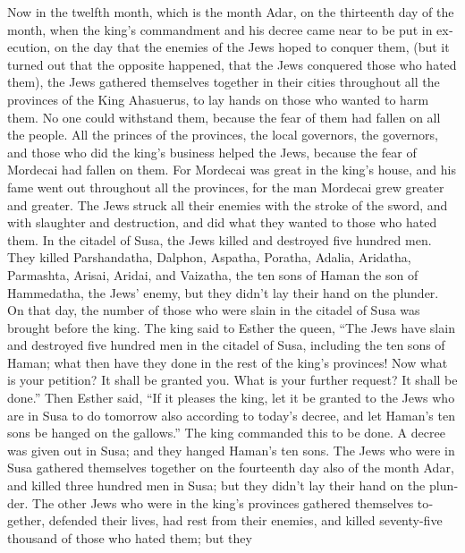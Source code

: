 \begin{paracol}{2}
\begin{otherlanguage}{english}
 Now in the twelfth month, which is the month Adar, on the
thirteenth day of the month, when the king's commandment and his decree
came near to be put in execution, on the day that the enemies of the
Jews hoped to conquer them, (but it turned out that the opposite
happened, that the Jews conquered those who hated them), 
the Jews gathered themselves together in their cities throughout all the
provinces of the King Ahasuerus, to lay hands on those who wanted to
harm them. No one could withstand them, because the fear of them had
fallen on all the people.  All the princes of the
provinces, the local governors, the governors, and those who did the
king's business helped the Jews, because the fear of Mordecai had fallen
on them.  For Mordecai was great in the king's house, and
his fame went out throughout all the provinces, for the man Mordecai
grew greater and greater.  The Jews struck all their
enemies with the stroke of the sword, and with slaughter and
destruction, and did what they wanted to those who hated them.
 In the citadel of Susa, the Jews killed and destroyed
five hundred men.  They killed Parshandatha, Dalphon,
Aspatha,  Poratha, Adalia, Aridatha, 
Parmashta, Arisai, Aridai, and Vaizatha,  the ten sons of
Haman the son of Hammedatha, the Jews' enemy, but they didn't lay their
hand on the plunder.  On that day, the number of those
who were slain in the citadel of Susa was brought before the king.
 The king said to Esther the queen, ``The Jews have slain
and destroyed five hundred men in the citadel of Susa, including the ten
sons of Haman; what then have they done in the rest of the king's
provinces! Now what is your petition? It shall be granted you. What is
your further request? It shall be done.''  Then Esther
said, ``If it pleases the king, let it be granted to the Jews who are in
Susa to do tomorrow also according to today's decree, and let Haman's
ten sons be hanged on the gallows.''  The king commanded
this to be done. A decree was given out in Susa; and they hanged Haman's
ten sons.  The Jews who were in Susa gathered themselves
together on the fourteenth day also of the month Adar, and killed three
hundred men in Susa; but they didn't lay their hand on the plunder.
 The other Jews who were in the king's provinces gathered
themselves together, defended their lives, had rest from their enemies,
and killed seventy-five thousand of those who hated them; but they

\end{otherlanguage}
\end{paracol}

